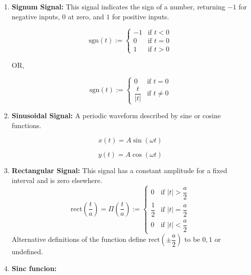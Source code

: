 \begin{enumerate}
\item \textbf{Signum Signal:} This signal indicates the sign of a number, returning $-1$ for negative inputs, $0$ at zero, and $1$ for positive inputs.
    \begin{center}
    \begin{minipage}{0.45\linewidth}
    \[
        \text{sgn}(t) := \begin{cases}
            -1 & \text{if } t < 0 \\
            0 & \text{if } t = 0 \\
            1 & \text{if } t > 0
        \end{cases}
    \]
    \end{minipage}
    OR,
    \hfill
    \begin{minipage}{0.45\linewidth}
        \[
            \text{sgn}(t) := \begin{cases}
            0 & \text{if } t = 0 \\
            \dfrac{t}{|t|} & \text{if } t \neq 0
        \end{cases}
        \]
    \end{minipage}
    \end{center}
\item \textbf{Sinusoidal Signal:} A periodic waveform described by sine or cosine functions. 
    \begin{center}
        \begin{minipage}{0.45\linewidth}
            \[x(t) = A \sin(\omega t)\]
        \end{minipage}
        \begin{minipage}{0.45\linewidth}
            \[y(t) = A \cos(\omega t)\]
        \end{minipage}
    \end{center}
\item \textbf{Rectangular Signal:} This signal has a constant amplitude for a fixed interval and is zero elsewhere.
    \[\text{rect}\left(\dfrac{t}{a}\right) = \Pi\left(\dfrac{t}{a}\right) := \begin{cases}
        0&\text{if } \left\lvert t \right\rvert > \dfrac{a}{2}\\
        \dfrac{1}{2}&\text{if } \left\lvert t \right\rvert = \dfrac{a}{2}\\
        0&\text{if } \left\lvert t \right\rvert < \dfrac{a}{2}
    \end{cases}\]
    Alternative definitions of the function define $\text{rect}(\pm \dfrac{a}{2})$ to be $0, 1$ or undefined.
\item \textbf{Sinc funcion:} 

\end{enumerate}
